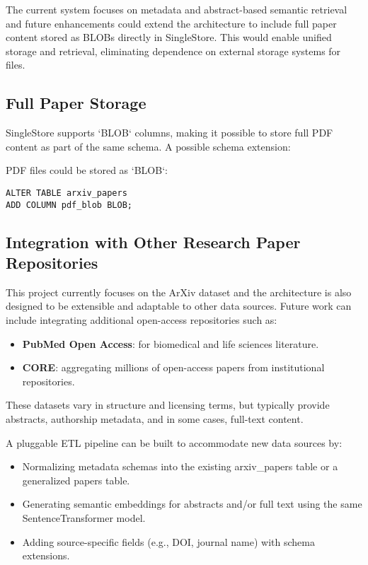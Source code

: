 \documentclass[11pt]{article}
\begin{document}
The current system focuses on metadata and abstract-based semantic retrieval and future enhancements could extend the architecture to include full paper content stored as BLOBs directly in SingleStore. This would enable unified storage and retrieval, eliminating dependence on external storage systems for files.
\subsection{Full Paper Storage}
\label{sec:org82b56e6}

SingleStore supports `BLOB` columns, making it possible to store full PDF content as part of the same schema. A possible schema extension:

PDF files could be stored as `BLOB`:

\begin{verbatim}
ALTER TABLE arxiv_papers
ADD COLUMN pdf_blob BLOB;
\end{verbatim}
\subsection{Integration with Other Research Paper Repositories}
\label{sec:orgb054fe9}

This project currently focuses on the ArXiv dataset and the architecture is also designed to be extensible and adaptable to other data sources. Future work can include integrating additional open-access repositories such as:

\begin{itemize}
\item \textbf{PubMed Open Access}: for biomedical and life sciences literature.
\item \textbf{CORE}: aggregating millions of open-access papers from institutional repositories.
\end{itemize}

These datasets vary in structure and licensing terms, but typically provide abstracts, authorship metadata, and in some cases, full-text content.

A pluggable ETL pipeline can be built to accommodate new data sources by:

\begin{itemize}
\item Normalizing metadata schemas into the existing arxiv\_papers table or a generalized papers table.
\item Generating semantic embeddings for abstracts and/or full text using the same SentenceTransformer model.
\item Adding source-specific fields (e.g., DOI, journal name) with schema extensions.
\end{itemize}
\end{document}
